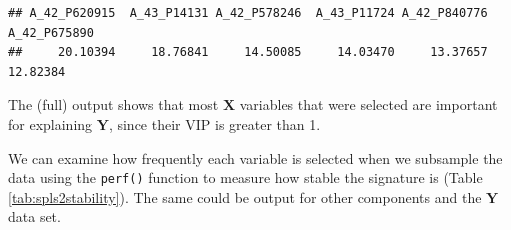 \documentclass[
]{book}
\newenvironment{Shaded}{\begin{snugshade}}{\end{snugshade}}
\newcommand{\AttributeTok}[1]{\textcolor[rgb]{0.77,0.63,0.00}{#1}}
\newcommand{\CommentTok}[1]{\textcolor[rgb]{0.56,0.35,0.01}{\textit{#1}}}
\newcommand{\DecValTok}[1]{\textcolor[rgb]{0.00,0.00,0.81}{#1}}
\newcommand{\FunctionTok}[1]{\textcolor[rgb]{0.00,0.00,0.00}{#1}}
\newcommand{\NormalTok}[1]{#1}
\newcommand{\OtherTok}[1]{\textcolor[rgb]{0.56,0.35,0.01}{#1}}
\newcommand{\SpecialCharTok}[1]{\textcolor[rgb]{0.00,0.00,0.00}{#1}}
\newcommand{\StringTok}[1]{\textcolor[rgb]{0.31,0.60,0.02}{#1}}
\begin{document}
\begin{verbatim}
## A_42_P620915  A_43_P14131 A_42_P578246  A_43_P11724 A_42_P840776 A_42_P675890 
##     20.10394     18.76841     14.50085     14.03470     13.37657     12.82384
\end{verbatim}

The (full) output shows that most \(\boldsymbol X\) variables that were selected are important for explaining \(\boldsymbol Y\), since their VIP is greater than 1.

We can examine how frequently each variable is selected when we subsample the data using the \texttt{perf()} function to measure how stable the signature is (Table \ref{tab:spls2stability}). The same could be output for other components and the \(\boldsymbol Y\) data set.

\begin{Shaded}
\end{Shaded}
\end{document}
